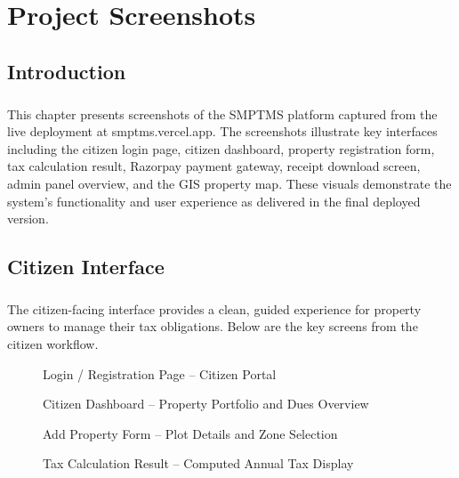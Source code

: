 \chapter{Project Screenshots}
\section{Introduction}
\paragraph{}This chapter presents screenshots of the SMPTMS platform captured from the live deployment at smptms.vercel.app. The screenshots illustrate key interfaces including the citizen login page, citizen dashboard, property registration form, tax calculation result, Razorpay payment gateway, receipt download screen, admin panel overview, and the GIS property map. These visuals demonstrate the system's functionality and user experience as delivered in the final deployed version.

\section{Citizen Interface}
\paragraph{}The citizen-facing interface provides a clean, guided experience for property owners to manage their tax obligations. Below are the key screens from the citizen workflow.

\begin{figure}[H]
  \centering
  \fbox{\rule{0pt}{8cm}\rule{12cm}{0pt}}
  \caption{Login / Registration Page -- Citizen Portal}
\end{figure}

\begin{figure}[H]
  \centering
  \fbox{\rule{0pt}{8cm}\rule{12cm}{0pt}}
  \caption{Citizen Dashboard -- Property Portfolio and Dues Overview}
\end{figure}

\begin{figure}[H]
  \centering
  \fbox{\rule{0pt}{8cm}\rule{12cm}{0pt}}
  \caption{Add Property Form -- Plot Details and Zone Selection}
\end{figure}

\begin{figure}[H]
  \centering
  \fbox{\rule{0pt}{8cm}\rule{12cm}{0pt}}
  \caption{Tax Calculation Result -- Computed Annual Tax Display}
\end{figure}

